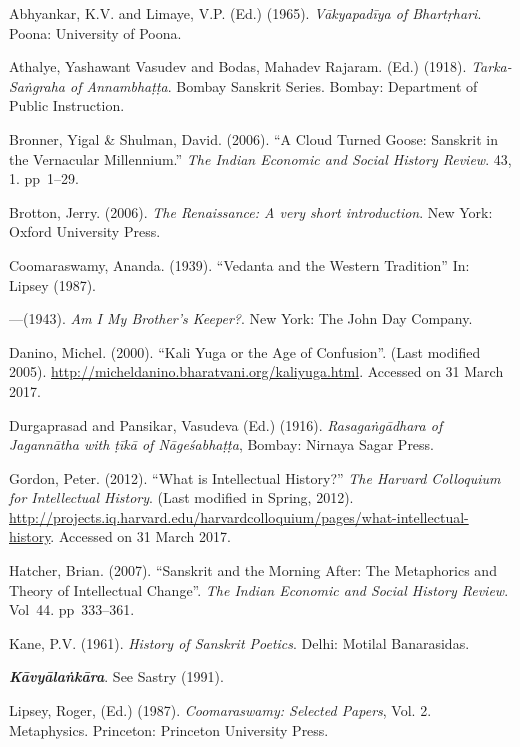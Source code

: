 \begin{thebibliography}{99}
\itemsep=1pt
Abhyankar, K.V. and Limaye, V.P. (Ed.) (1965). {\sl Vākyapadīya of Bhartṛhari}. Poona: University of Poona.

 Athalye, Yashawant Vasudev and Bodas, Mahadev Rajaram. (Ed.) (1918). {\sl Tarka-Saṅgraha of Annambhaṭṭa}. Bombay Sanskrit Series. Bombay: Department of Public Instruction. 

 Bronner, Yigal \& Shulman, David. (2006). “A Cloud Turned Goose: Sanskrit in the Vernacular Millennium.” {\sl The Indian Economic and Social History Review}. 43, 1. pp~1--29.

Brotton, Jerry. (2006). {\sl The Renaissance: A very short introduction}. New York: Oxford University Press. 

Coomaraswamy, Ananda. (1939). ``Vedanta and the Western Tradition'' In: Lipsey (1987).

---\kern3pt(1943). {\sl Am I My Brother’s Keeper?}. New York: The John Day Company. 

Danino, Michel. (2000). “Kali Yuga or the Age of Confusion”. (Last modified 2005). \url{http://micheldanino.bharatvani.org/kaliyuga.html}. Accessed on 31 March 2017.

Durgaprasad and Pansikar, Vasudeva (Ed.) (1916). {\sl Rasagaṅgādhara of Jagannātha with ṭīkā of Nāgeśabhaṭṭa}, Bombay: Nirnaya Sagar Press. 

Gordon, Peter. (2012). “What is Intellectual History?” {\sl The Harvard Colloquium for Intellectual History}. (Last modified in Spring, 2012). \url{http://projects.iq.harvard.edu/harvardcolloquium/pages/what-intellectual-history}. Accessed on 31 March 2017. 

 Hatcher, Brian. (2007). “Sanskrit and the Morning After: The Metaphorics and Theory of Intellectual Change”. {\sl The Indian Economic and Social History Review}. Vol~44. pp~333--361. 

 Kane, P.V. (1961). {\sl History of Sanskrit Poetics}.  Delhi: Motilal Banarasidas. 

{\sl\bfseries Kāvyālaṅkāra}. See Sastry (1991).

 Lipsey, Roger, (Ed.) (1987). {\sl Coomaraswamy: Selected Papers}, Vol. 2. Metaphysics. Princeton: Princeton University Press. 


\end{thebibliography}
